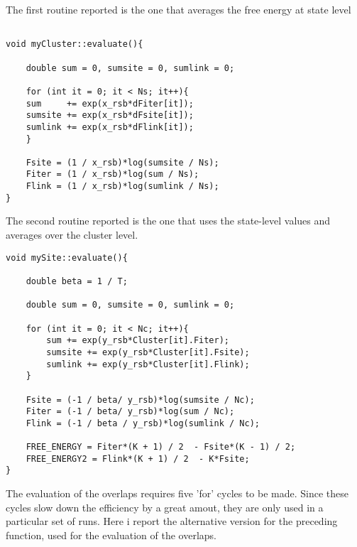 The first routine reported is the one that averages the free energy at state level

\begin{verbatim}

void myCluster::evaluate(){
	
	double sum = 0, sumsite = 0, sumlink = 0;

	for (int it = 0; it < Ns; it++){
	sum     += exp(x_rsb*dFiter[it]);
	sumsite += exp(x_rsb*dFsite[it]);
	sumlink += exp(x_rsb*dFlink[it]);
	}

	Fsite = (1 / x_rsb)*log(sumsite / Ns);
	Fiter = (1 / x_rsb)*log(sum / Ns);
	Flink = (1 / x_rsb)*log(sumlink / Ns);
}
\end{verbatim}

The second routine reported is the one that uses the state-level values and averages over the cluster level.

\begin{verbatim}
void mySite::evaluate(){

	double beta = 1 / T;

	double sum = 0, sumsite = 0, sumlink = 0;

	for (int it = 0; it < Nc; it++){
		sum += exp(y_rsb*Cluster[it].Fiter);
		sumsite += exp(y_rsb*Cluster[it].Fsite);
		sumlink += exp(y_rsb*Cluster[it].Flink);
	}

	Fsite = (-1 / beta/ y_rsb)*log(sumsite / Nc);
	Fiter = (-1 / beta/ y_rsb)*log(sum / Nc);
	Flink = (-1 / beta / y_rsb)*log(sumlink / Nc);

	FREE_ENERGY = Fiter*(K + 1) / 2  - Fsite*(K - 1) / 2;
	FREE_ENERGY2 = Flink*(K + 1) / 2  - K*Fsite;
}

\end{verbatim}

The evaluation of the overlaps requires five 'for' cycles to be made. Since these cycles slow down the efficiency by a great amout, 
they are only used in a particular set of runs. Here i report the alternative version for the preceding function, used for the evaluation of the overlaps.

